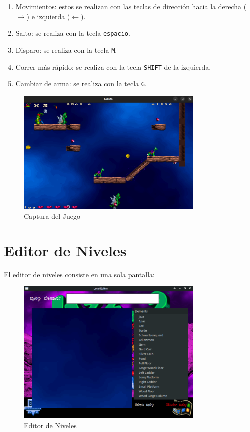 \documentclass[titlepage,a4paper]{article}
\begin{document}
\begin{enumerate}
  \item Movimientos: estos se realizan con las teclas de dirección hacia la derecha ($\rightarrow$) e izquierda ($\leftarrow$).
  \item Salto: se realiza con la tecla \texttt{espacio}.
  \item Disparo: se realiza con la tecla \texttt{M}.
  \item Correr más rápido: se realiza con la tecla \texttt{SHIFT} de la izquierda.
  \item Cambiar de arma: se realiza con la tecla \texttt{G}.
\end{enumerate}

\begin{figure}[H]
  \centering
  \includegraphics[width=0.8\textwidth]{images/gameScreen.png}
  \caption{Captura del Juego}
  \label{fig:game}
\end{figure}

\section{Editor de Niveles}
El editor de niveles consiste en una sola pantalla:

\begin{figure}[H]
  \centering
  \includegraphics[width=0.8\textwidth]{images/LevelEditor/LevelEditor.png}
  \caption{Editor de Niveles}
  \label{fig:level-editor}
\end{figure}
\end{document}
